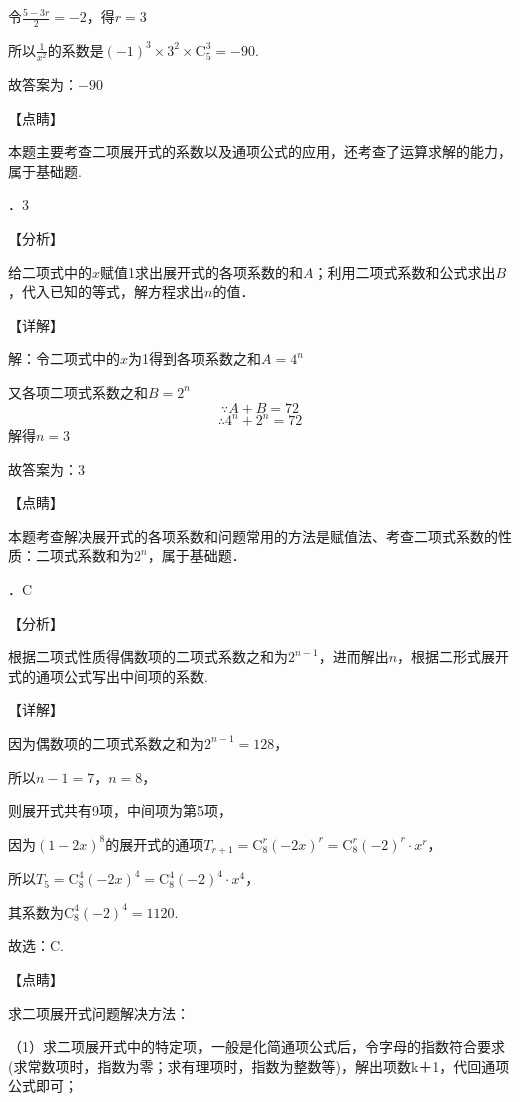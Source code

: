 \noindent 令$\frac{5-3r}{2} =-2$，得$r=3$

\noindent 所以$\frac{1}{x^{2} } $的系数是$\left(-1\right)^{3} \times 3^{2} \times \mathrm C_{5}^{3} =-90$.

\noindent 故答案为：$-90$

\noindent 【点睛】

\noindent 本题主要考查二项展开式的系数以及通项公式的应用，还考查了运算求解的能力，属于基础题.

．3

\noindent 【分析】

\noindent 给二项式中的$x$赋值1求出展开式的各项系数的和$A$；利用二项式系数和公式求出$B$，代入已知的等式，解方程求出$n$的值．

\noindent 【详解】

\noindent 解：令二项式中的$x$为1得到各项系数之和$A=4^{n} $

\noindent 又各项二项式系数之和$B=2^{n} $
\[\because A+B=72\] 
\[\therefore 4^{n} +2^{n} =72\] 
解得$n=3$

\noindent 故答案为：3

\noindent 【点睛】

\noindent 本题考查解决展开式的各项系数和问题常用的方法是赋值法、考查二项式系数的性质：二项式系数和为$2^{n} $，属于基础题．

．C

\noindent 【分析】

\noindent 根据二项式性质得偶数项的二项式系数之和为$2^{n-1} $，进而解出$n$，根据二形式展开式的通项公式写出中间项的系数.

\noindent 【详解】

\noindent 因为偶数项的二项式系数之和为$2^{n-1} =128$，

\noindent 所以$n-1=7$，$n=8$，

\noindent 则展开式共有9项，中间项为第5项，

\noindent 因为$(1-2x)^{8} $的展开式的通项$T_{r+1} =\mathrm C_{8}^{r} (-2x)^{r} =\mathrm C_{8}^{r} (-2)^{r} \cdot x^{r} $，

\noindent 所以$T_{5} =\mathrm C_{8}^{4} (-2x)^{4} =\mathrm C_{8}^{4} (-2)^{4} \cdot x^{4} $，

\noindent 其系数为$\mathrm C_{8}^{4} (-2)^{4} =1120$.

\noindent 故选：C.

\noindent 【点睛】

\noindent 求二项展开式问题解决方法：

\noindent （1）求二项展开式中的特定项，一般是化简通项公式后，令字母的指数符合要求(求常数项时，指数为零；求有理项时，指数为整数等)，解出项数k＋1，代回通项公式即可；

